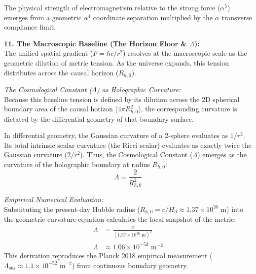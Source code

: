 The physical strength of electromagnetism relative to the strong force ($\alpha^5$) emerges from a geometric $\alpha^4$ coordinate separation multiplied by the $\alpha$ transverse compliance limit.





\vspace{0.2 cm}

\textbf{11. The Macroscopic Baseline (The Horizon Floor \& $\Lambda$):} \\
The unified spatial gradient ($F = \hbar c / r^2$) resolves at the macroscopic scale as the geometric dilution of metric tension. As the universe expands, this tension distributes across the causal horizon ($R_{h,0}$). 

\vspace{0.2 cm}
\textit{The Cosmological Constant ($\Lambda$) as Holographic Curvature:} \\
Because this baseline tension is defined by its dilution across the 2D spherical boundary area of the causal horizon ($4\pi R_{h,0}^2$), the corresponding curvature is dictated by the differential geometry of that boundary surface. 

In differential geometry, the Gaussian curvature of a 2-sphere evaluates as $1/r^2$. Its total intrinsic scalar curvature (the Ricci scalar) evaluates as exactly twice the Gaussian curvature ($2/r^2$). Thus, the Cosmological Constant ($\Lambda$) emerges as the curvature of the holographic boundary at radius $R_{h,0}$:
\begin{equation}
    \Lambda = \frac{2}{R_{h,0}^2} \label{eq:lambda_fluid_derivation}
\end{equation}

\vspace{0.2 cm}
\textit{Empirical Numerical Evaluation:} \\
Substituting the present-day Hubble radius ($R_{h,0} = c / H_0 \approx 1.37 \times 10^{26} \text{ m}$) into the geometric curvature equation calculates the local snapshot of the metric: 
\begin{align}
    \Lambda &= \frac{2}{(1.37 \times 10^{26} \text{ m})^2} \nonumber \\
    \Lambda &\approx 1.06 \times 10^{-52} \text{ m}^{-2} 
\end{align}
This derivation reproduces the Planck 2018 empirical measurement ($\Lambda_{obs} \approx 1.1 \times 10^{-52} \text{ m}^{-2}$) from continuous boundary geometry.

